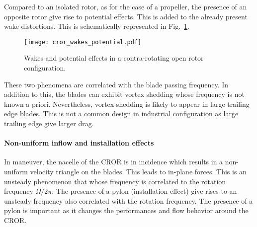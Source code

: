 Compared to an isolated rotor, as for the case of a propeller,
the presence of an opposite rotor give rise to potential effects.
This is added to the already present wake distortions. This is
schematically represented in Fig.~\ref{fig:cror_wakes_potential}.
\begin{figure}[htb]
  \centering
  \texttt{[image: cror\_wakes\_potential.pdf]}
  \caption{Wakes and potential effects in a 
  contra-rotating open rotor configuration.}
  \label{fig:cror_wakes_potential}
\end{figure}
These two phenomena are correlated with the blade passing frequency.
In addition to this, the blades can exhibit vortex shedding whose frequency
is not known a priori.
Nevertheless,
vortex-shedding is likely to appear in large trailing edge blades.
This is not a common design in industrial configuration as large trailing edge
give larger drag.

\paragraph{Non-uniform inflow and installation effects}

In maneuver, the nacelle of the CROR is in incidence
which results in a non-uniform velocity triangle on the blades.
This leads to in-plane forces. This is an unsteady phenomenon that
whose frequency is correlated to the rotation frequency $\Omega / 2 \pi$.
The presence of a pylon (installation effect) give rises to an unsteady frequency
also correlated with the rotation frequency. The presence of a pylon
is important as it changes the performances and flow behavior around the CROR.
